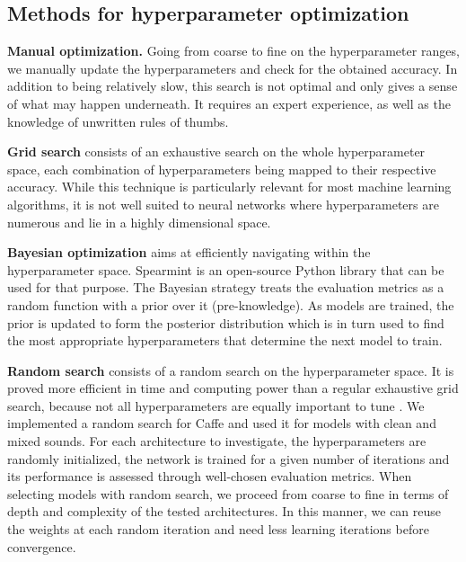 \subsection{Methods for hyperparameter optimization}
\label{methods:architecture:random}

\textbf{Manual optimization.} Going from coarse to fine on the hyperparameter ranges, we manually update the hyperparameters and check for the obtained accuracy. In addition to being relatively slow, this search is not optimal and only gives a sense of what may happen underneath. It requires an expert experience, as well as the knowledge of unwritten rules of thumbs.

\textbf{Grid search} consists of an exhaustive search on the whole hyperparameter space, each combination of hyperparameters being mapped to their respective accuracy. While this technique is particularly relevant for most machine learning algorithms, it is not well suited to neural networks where hyperparameters are numerous and lie in a highly dimensional space.

\textbf{Bayesian optimization} aims at efficiently navigating within the hyperparameter space. Spearmint \parencite{snoek2012practical} is an open-source Python library that can be used for that purpose. The Bayesian strategy treats the evaluation metrics as a random function with a prior over it (pre-knowledge). As models are trained, the prior is updated to form the posterior distribution which is in turn used to find the most appropriate hyperparameters that determine the next model to train.

\textbf{Random search} consists of a random search on the hyperparameter space. It is proved more efficient in time and computing power than a regular exhaustive grid search, because not all hyperparameters are equally important to tune \parencite{bergstra2012random}. We implemented a random search for Caffe and used it for models with clean and mixed sounds. For each architecture to investigate, the hyperparameters are randomly initialized, the network is trained for a given number of iterations and its performance is assessed through well-chosen evaluation metrics. When selecting models with random search, we proceed from coarse to fine in terms of depth and complexity of the tested architectures. In this manner, we can reuse the weights at each random iteration and need less learning iterations before convergence.